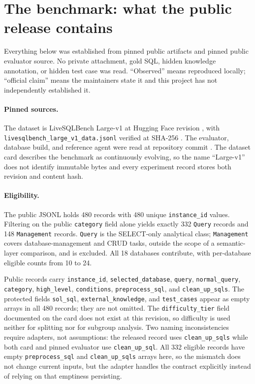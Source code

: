 \section{The benchmark: what the public release contains}
\label{sec:benchmark}

Everything below was established from pinned public artifacts and pinned public
evaluator source. No private attachment, gold SQL, hidden knowledge annotation,
or hidden test case was read. ``Observed'' means reproduced locally; ``official
claim'' means the maintainers state it and this project has not independently
established it.

\paragraph{Pinned sources.}
The dataset is LiveSQLBench Large-v1 at Hugging Face revision
, with
\texttt{livesqlbench\_large\_v1\_data.jsonl} verified at SHA-256
. The
evaluator, database build, and reference agent were read at repository commit
. The dataset card describes the
benchmark as continuously evolving, so the name ``Large-v1'' does not identify
immutable bytes and every experiment record stores both revision and content
hash.

\paragraph{Eligibility.}
The public JSONL holds 480 records with 480 unique \texttt{instance\_id} values.
Filtering on the public \texttt{category} field alone yields exactly 332
\texttt{Query} records and 148 \texttt{Management} records. \texttt{Query} is the
SELECT-only analytical class; \texttt{Management} covers database-management and
CRUD tasks, outside the scope of a semantic-layer comparison, and is excluded.
All 18 databases contribute, with per-database eligible counts from 10 to 24.

Public records carry \texttt{instance\_id}, \texttt{selected\_database},
\texttt{query}, \texttt{normal\_query}, \texttt{category}, \texttt{high\_level},
\texttt{conditions}, \texttt{preprocess\_sql}, and \texttt{clean\_up\_sqls}. The
protected fields \texttt{sol\_sql}, \texttt{external\_knowledge}, and
\texttt{test\_cases} appear as empty arrays in all 480 records; they are not
omitted. The \texttt{difficulty\_tier} field documented on the card does not exist
at this revision, so difficulty is used neither for splitting nor for subgroup
analysis. Two naming inconsistencies require adapters, not assumptions:
the released record uses \texttt{clean\_up\_sqls} while both card and pinned
evaluator use \texttt{clean\_up\_sql}. All 332 eligible records have empty
\texttt{preprocess\_sql} and \texttt{clean\_up\_sqls} arrays here, so the
mismatch does not change current inputs, but the adapter handles the contract
explicitly instead of relying on that emptiness persisting.

